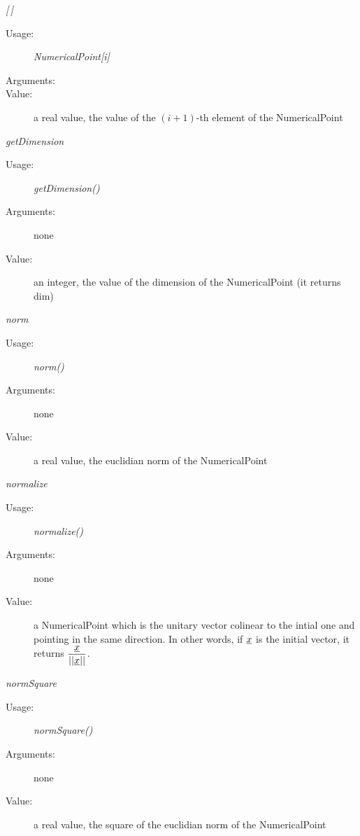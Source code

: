 \begin{description}
\begin{description}

\item \textit{[\,]}
\begin{description}
\item[Usage:] \textit{NumericalPoint[i]}
\item[Arguments:] \rule{0pt}{1em}
\item[Value:] a real value, the value of the $(i+1)$-th element of the NumericalPoint
\end{description}
\bigskip

\item \textit{getDimension}
\begin{description}
\item[Usage:] \textit{getDimension()}
\item[Arguments:] none
\item[Value:] an integer, the value of the dimension of the NumericalPoint  (it returns dim)
\end{description}
\bigskip

\item \textit{norm}
\begin{description}
\item[Usage:] \textit{norm()}
\item[Arguments:] none
\item[Value:] a real value, the euclidian norm of the NumericalPoint
\end{description}
\bigskip

\item \textit{normalize}
\begin{description}
\item[Usage:] \textit{normalize()}
\item[Arguments:] none
\item[Value:] a NumericalPoint which is the unitary vector colinear to the intial one and pointing in the same direction. In other words, if ${\underline{x}}$ is the initial vector, it returns $\displaystyle \frac{{\underline{x}}}{||{\underline{x}}||}$.
\end{description}
\bigskip

\item \textit{normSquare}
\begin{description}
\item[Usage:] \textit{normSquare()}
\item[Arguments:] none
\item[Value:] a real value, the square of the euclidian norm of the NumericalPoint
\end{description}
\bigskip


\end{description}
\end{description}
